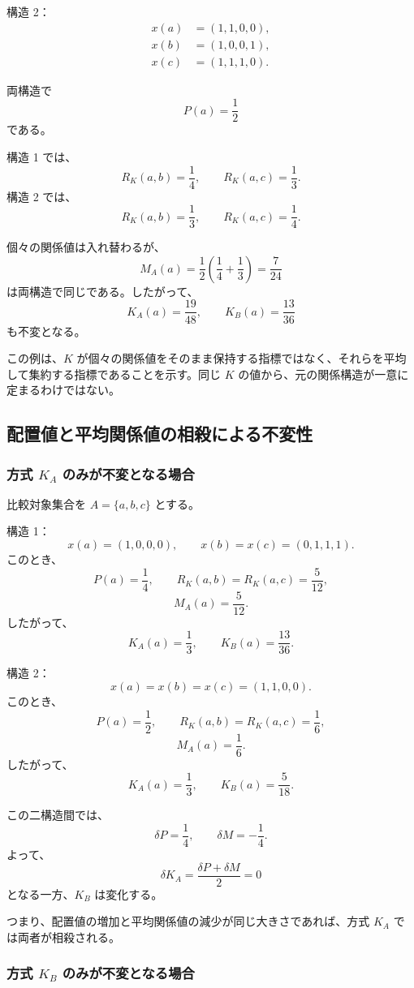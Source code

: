 \documentclass[a4paper,11pt]{ltjsarticle}
\begin{document}
構造 2：
\[
\begin{aligned}
x(a)&=(1,1,0,0),\\
x(b)&=(1,0,0,1),\\
x(c)&=(1,1,1,0).
\end{aligned}
\]

両構造で
\[
P(a)=\frac12
\]
である。

構造 1 では、
\[
R_K(a,b)=\frac14,\qquad
R_K(a,c)=\frac13.
\]
構造 2 では、
\[
R_K(a,b)=\frac13,\qquad
R_K(a,c)=\frac14.
\]

個々の関係値は入れ替わるが、
\[
M_A(a)=\frac12\left(\frac14+\frac13\right)
=\frac7{24}
\]
は両構造で同じである。したがって、
\[
K_A(a)=\frac{19}{48},\qquad
K_B(a)=\frac{13}{36}
\]
も不変となる。

この例は、$K$ が個々の関係値をそのまま保持する指標ではなく、それらを平均して集約する指標であることを示す。同じ $K$ の値から、元の関係構造が一意に定まるわけではない。

\subsection{配置値と平均関係値の相殺による不変性}

\subsubsection{方式 $K_A$ のみが不変となる場合}

比較対象集合を $A=\{a,b,c\}$ とする。

構造 1：
\[
x(a)=(1,0,0,0),\qquad
x(b)=x(c)=(0,1,1,1).
\]
このとき、
\[
P(a)=\frac14,\qquad
R_K(a,b)=R_K(a,c)=\frac5{12},
\]
\[
M_A(a)=\frac5{12}.
\]
したがって、
\[
K_A(a)=\frac13,\qquad
K_B(a)=\frac{13}{36}.
\]

構造 2：
\[
x(a)=x(b)=x(c)=(1,1,0,0).
\]
このとき、
\[
P(a)=\frac12,\qquad
R_K(a,b)=R_K(a,c)=\frac16,
\]
\[
M_A(a)=\frac16.
\]
したがって、
\[
K_A(a)=\frac13,\qquad
K_B(a)=\frac5{18}.
\]

この二構造間では、
\[
\delta P=\frac14,\qquad
\delta M=-\frac14.
\]
よって、
\[
\delta K_A=\frac{\delta P+\delta M}{2}=0
\]
となる一方、$K_B$ は変化する。

つまり、配置値の増加と平均関係値の減少が同じ大きさであれば、方式 $K_A$ では両者が相殺される。

\subsubsection{方式 $K_B$ のみが不変となる場合}
\end{document}

